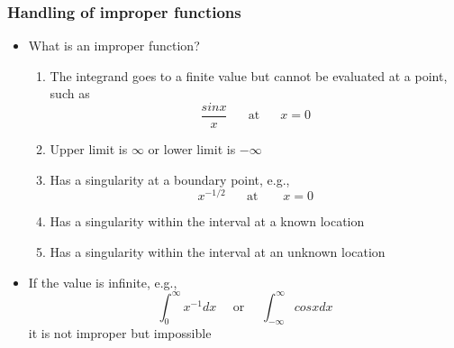 \documentclass[10pt]{beamer}
\begin{document}
\begin{frame}
  \frametitle{Handling of improper functions}
  \begin{itemize}
  \item What is an improper function?
    \pause
    \begin{enumerate}
    \item The integrand goes to a finite value but cannot be evaluated at a point, such as
      \[
        \frac{sin x}{x} \mbox{ ~~~ at ~~~ } x=0
      \]
    \item Upper limit is $\infty$ or lower limit is $-\infty$
    \item Has a singularity at a boundary point, e.g.,
      \[
        x^{-1/2} \mbox{~~~~ at ~~~~~} x = 0
      \]
    \item Has a singularity within the interval at a known location
    \item Has a singularity within the interval at an unknown location
    \end{enumerate}
  \item If the value is infinite, e.g.,
    \[
      \int_0^{\infty} x^{-1} dx \mbox{~~~~or~~~~} \int_{-\infty}^{\infty} cos x dx
    \] it is not improper but impossible
  \end{itemize}
\end{frame}
\end{document}
